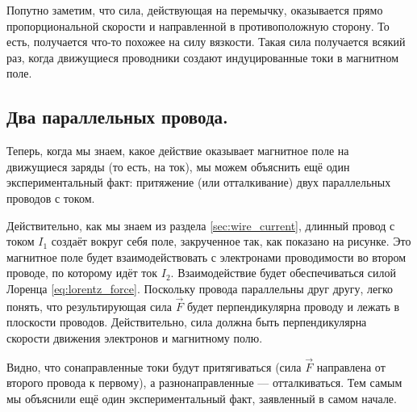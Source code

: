 \documentclass[a4paper,12pt]{article}
\numberwithin{equation}{section}
\begin{document}
Попутно заметим, что сила, действующая на перемычку, оказывается прямо
пропорциональной скорости и направленной в противоположную сторону. То
есть, получается что-то похожее на силу вязкости. Такая сила
получается всякий раз, когда движущиеся проводники создают
индуцированные токи в магнитном поле.

\subsection{Два параллельных провода.}
\label{sec:two_parallel_lines}

Теперь, когда мы знаем, какое действие оказывает магнитное поле на
движущиеся заряды (то есть, на ток), мы можем объяснить ещё один
экспериментальный факт: притяжение (или отталкивание) двух
параллельных проводов с током.

\begin{figure}
\centering
{}
\label{fig:current_wire_ampere}
\end{figure}

Действительно, как мы знаем из раздела \ref{sec:wire_current}, длинный
провод с током $I_1$ создаёт вокруг себя поле, закрученное так, как
показано на рисунке. Это магнитное поле будет взаимодействовать с
электронами проводимости во втором проводе, по которому идёт ток
$I_2$. Взаимодействие будет обеспечиваться силой Лоренца
\eqref{eq:lorentz_force}. Поскольку провода параллельны друг другу,
легко понять, что результирующая сила $\vec{F}$ будет перпендикулярна
проводу и лежать в плоскости проводов. Действительно, сила должна быть
перпендикулярна скорости движения электронов и магнитному полю.

Видно, что сонаправленные токи будут притягиваться (сила $\vec{F}$
направлена от второго провода к первому), а разнонаправленные ---
отталкиваться. Тем самым мы объяснили ещё один экспериментальный факт,
заявленный в самом начале.  
\end{document}
